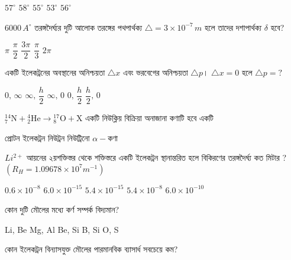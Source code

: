 \documentclass[addpoints]{exam}
\begin{document}
\begin{questions}
\begin{oneparchoices}
\choice $ 57^{\circ} $
\choice $ 58^{\circ} $
\choice $ 55^{\circ} $
\choice $ 53^{\circ} $
\choice $ 56^{\circ} $
\end{oneparchoices}

\question  $ 6000\,A^{\circ} $ তরঙ্গদৈর্ঘ্যর দুটি আলোক তরঙ্গের পথপার্থক্য $ \triangle = 3\times 10^{-7}\,m $ হলে তাদের দশাপার্থক্য $\delta$ হবে?

\begin{oneparchoices}
\choice $ \pi $
\choice $ \dfrac{\pi}{2} $
\choice $ \dfrac{3\pi}{2} $
\choice $ \dfrac{\pi}{3} $
\choice $ 2\pi $
\end{oneparchoices}

\question   একটি ইলেকট্রনের অবস্থানের অনিশ্চয়তা $ \triangle x $ এবং ভরবেগের অনিশ্চয়তা $ \triangle p $। $ \triangle x  =0$ হলে $ \triangle p = ?$


\begin{oneparchoices}
\choice $ 0,\, \infty $
\choice $ \infty,\,\dfrac{h}{2} $
\choice $ \infty,\, 0 $
\choice $ 0,\,\dfrac{h}{2} $
\choice $ \dfrac{h}{2},\, 0 $
\end{oneparchoices}

\question  $ {}^{14}_7\textrm{N} + {}^{4}_{2}\textrm{He} \to {}^{17}_{8}\textrm{O} + \textrm{X} $ একটি নিউক্লিয় বিক্রিয়া অনাজানা কণাটি হবে একটি  

\begin{oneparchoices}
\choice প্রোটন 
\choice ইলেকট্রন 
\choice নিউট্রন 
\choice নিউট্রিনো 
\choice $ \alpha- $কণা
\end{oneparchoices}



\question  $ Li^{2+} $ আয়নের ২য়শক্তিস্তর থেকে শক্তিস্তরে একটি ইলেকট্রন স্থানান্তরিত হলে বিকিরণের তরঙ্গদৈর্ঘ্য কত মিটার ? $ (R_{H} = 1.09678\times 10^{7}m^{-1}) $

\begin{oneparchoices}
\choice $ 0.6\times 10^{-8} $
\choice $ 6.0\times 10^{-15} $
\choice $ 5.4\times 10^{-15} $
\choice $ 5.4\times 10^{-8} $
\choice $ 6.0\times 10^{-10} $
\end{oneparchoices}

\question  কোন দুটি মৌলের মধ্যে কর্ণ সম্পর্ক বিদ্যমান?

\begin{oneparchoices}
\choice Li, Be
\choice Mg, Al
\choice Be, Si
\choice B, Si
\choice O, S
\end{oneparchoices}

\question  কোন  ইলেকট্রন বিন্যাসযুক্ত মৌলের পারমানবিক ব্যাসার্ধ সবচেয়ে কম?


\end{questions}
\end{document}
